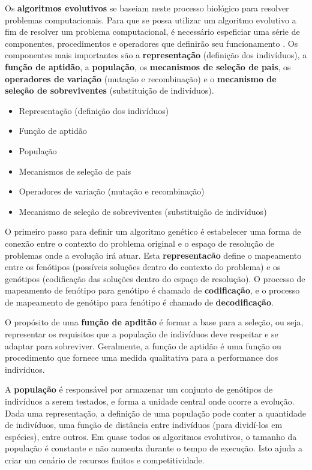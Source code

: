Os \textbf{algoritmos evolutivos} se baseiam neste processo biológico para
resolver problemas computacionais. Para que se possa utilizar um algoritmo
evolutivo a fim de resolver um problema computacional, é necessário espeficiar
uma série de componentes, procedimentos e operadores que definirão seu
funcionamento \cite[Cap. 3]{IntroEvolComputing}. Os componentes mais importantes
são a \textbf{representação} (definição dos indivíduos), a \textbf{função de
aptidão}, a \textbf{população}, os \textbf{mecanismos de seleção de pais}, os
\textbf{operadores de variação} (mutação e recombinação) e o \textbf{mecanismo
de seleção de sobreviventes} (substituição de indivíduos).

\begin{itemize}
	\item Representação (definição dos indivíduos)
	\item Função de aptidão
	\item População
	\item Mecanismos de seleção de pais
	\item Operadores de variação (mutação e recombinação)
	\item Mecanismo de seleção de sobreviventes (substituição de indivíduos)
\end{itemize}

O primeiro passo para definir um algoritmo genético é estabelecer uma forma de
conexão entre o contexto do problema original e o espaço de resolução de
problemas onde a evolução irá atuar. Esta \textbf{representacão} define o
mapeamento entre os fenótipos (possíveis soluções dentro do contexto do
problema) e os genótipos (codificação das soluções dentro do espaço de
resolução). O processo de mapeamento de fenótipo para genótipo é chamado de
\textbf{codificação}, e o processo de mapeamento de genótipo para fenótipo é
chamado de \textbf{decodificação}.

O propósito de uma \textbf{função de apditão} é formar a base para a seleção, ou
seja, representar os requisitos que a população de indivíduos deve respeitar e
se adaptar para sobreviver. Geralmente, a função de aptidão é uma função ou
procedimento que fornece uma medida qualitativa para a performance dos
indivíduos.

A \textbf{população} é responsável por armazenar um conjunto de genótipos de
indivíduos a serem testados, e forma a unidade central onde ocorre a evolução.
Dada uma representação, a definição de uma população pode conter a quantidade de
indivíduos, uma função de distância entre indivíduos (para dividí-los em
espécies), entre outros. Em quase todos os algoritmos evolutivos, o tamanho da
população é constante e não aumenta durante o tempo de execução. Isto ajuda a
criar um cenário de recursos finitos e competitividade. 

